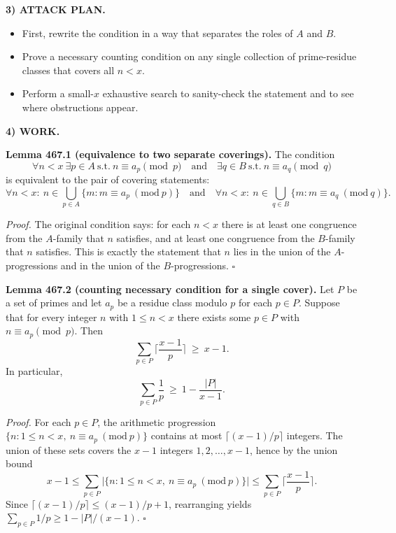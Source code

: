 \medskip
\noindent\textbf{3) ATTACK PLAN.}

\begin{itemize}
\item First, rewrite the condition in a way that separates the roles of $A$ and $B$.
\item Prove a necessary counting condition on any single collection of prime-residue classes that covers all $n<x$.
\item Perform a small-$x$ exhaustive search to sanity-check the statement and to see where obstructions appear.
\end{itemize}

\medskip
\noindent\textbf{4) WORK.}

\noindent\textbf{Lemma 467.1 (equivalence to two separate coverings).}
The condition
\[
\forall n<x\ \exists p\in A\ \text{s.t.}\ n\equiv a_p\pmod p\quad\text{and}\quad \exists q\in B\ \text{s.t.}\ n\equiv a_q\pmod q
\]
is equivalent to the pair of covering statements:
\[
\forall n<x:\ n\in \bigcup_{p\in A}\{m: m\equiv a_p\ (\mathrm{mod}\ p)\}\quad\text{and}\quad
\forall n<x:\ n\in \bigcup_{q\in B}\{m: m\equiv a_q\ (\mathrm{mod}\ q)\}.
\]

\textit{Proof.}
The original condition says: for each $n<x$ there is at least one congruence from the $A$-family that $n$ satisfies, and at least one congruence from the $B$-family that $n$ satisfies. This is exactly the statement that $n$ lies in the union of the $A$-progressions and in the union of the $B$-progressions. \hfill$\square$

\medskip
\noindent\textbf{Lemma 467.2 (counting necessary condition for a single cover).}
Let $P$ be a set of primes and let $a_p$ be a residue class modulo $p$ for each $p\in P$. Suppose that for every integer $n$ with $1\le n<x$ there exists some $p\in P$ with $n\equiv a_p\pmod p$. Then
\[
\sum_{p\in P}\Big\lceil\frac{x-1}{p}\Big\rceil\ \ge\ x-1.
\]
In particular,
\[
\sum_{p\in P}\frac{1}{p}\ \ge\ 1-\frac{|P|}{x-1}.
\]

\textit{Proof.}
For each $p\in P$, the arithmetic progression $\{n: 1\le n<x,\ n\equiv a_p\ (\mathrm{mod}\ p)\}$ contains at most $\lceil (x-1)/p\rceil$ integers. The union of these sets covers the $x-1$ integers $1,2,\dots,x-1$, hence by the union bound
\[
 x-1\le \sum_{p\in P}\Big|\{n:1\le n<x,\ n\equiv a_p\ (\mathrm{mod}\ p)\}\Big|\le \sum_{p\in P}\Big\lceil\frac{x-1}{p}\Big\rceil.
\]
Since $\lceil (x-1)/p\rceil\le (x-1)/p+1$, rearranging yields $\sum_{p\in P} 1/p\ge 1-|P|/(x-1)$. \hfill$\square$

